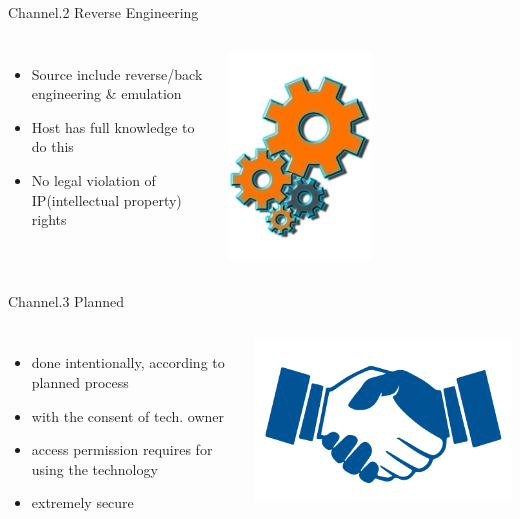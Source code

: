 \begin{frame}{Channel.2 Reverse Engineering}
\begin{columns}
\begin{itemize}
	\item Source include reverse/back engineering \& emulation
	\item Host has full knowledge to do this
	\item No legal violation of IP(intellectual property) rights
\end{itemize}
\includegraphics[width=0.5\textwidth]{img/geers.png}
\end{columns}
\end{frame}

\begin{frame}{Channel.3 Planned}
\begin{columns}
\begin{itemize}
	\item done intentionally, according to planned process
	\item with the consent of tech. owner
	\item access permission requires for using the technology
	\item extremely secure
\end{itemize}
\includegraphics[width=\textwidth]{img/handshake.png}
\end{columns}
\end{frame}

